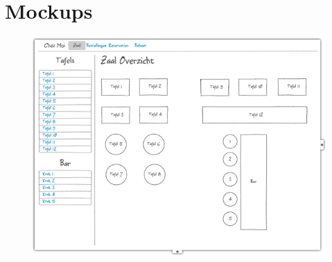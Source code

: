 \documentclass[a4paper]{article}
\begin{document}
\section{Mockups}
\begin{figure}[H]
\centering
  \includegraphics[width=1.0\linewidth]{restaurant_mockup.jpg}
\end{figure}
\end{document}
